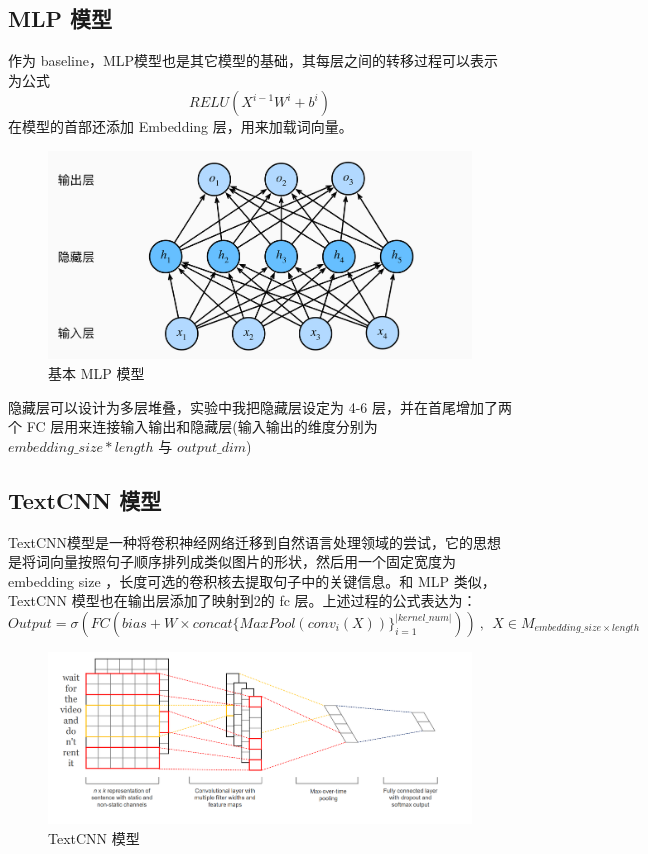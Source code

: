 \documentclass{article}
\begin{document}
\begin{spacing}{1.1}
	\subsection{MLP 模型}
	\hspace{1.4em} 作为 baseline，MLP模型也是其它模型的基础，其每层之间的转移过程可以表示为公式 $$RELU(X^{i-1}W^{i}+b^{i})$$ 在模型的首部还添加 Embedding 层，用来加载词向量。
	
	
	\begin{figure}[h]
		\centering
		\includegraphics[width=0.8\linewidth]{pic/mlp.png}
		\caption{基本 MLP 模型}
	\end{figure}
	 
	隐藏层可以设计为多层堆叠，实验中我把隐藏层设定为 4-6 层，并在首尾增加了两个 FC 层用来连接输入输出和隐藏层(输入输出的维度分别为 $embedding\_size* length$ 与 $output\_dim$)
	
	\subsection{TextCNN 模型}
	\hspace{1.4em}
	TextCNN模型是一种将卷积神经网络迁移到自然语言处理领域的尝试，它的思想是将词向量按照句子顺序排列成类似图片的形状，然后用一个固定宽度为 embedding size ，长度可选的卷积核去提取句子中的关键信息。和 MLP 类似，TextCNN 模型也在输出层添加了映射到2的 fc 层。上述过程的公式表达为：	
	$$ Output = \sigma(FC(bias + W \times concat\{MaxPool(conv_i(X))\}^{|kernel\_num|}_{i=1})) \ , \ \ X\in M_{embedding\_size\times length} $$
	\begin{figure}[h]
		\centering
		\includegraphics[width=0.8\linewidth]{pic/TextCNN.png}
		\caption{TextCNN 模型}
	\end{figure}
	

\end{spacing}
\end{document}
